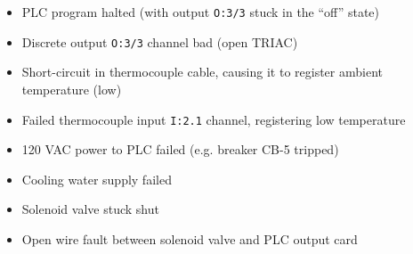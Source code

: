 \begin{itemize}
\item{} PLC program halted (with output {\tt O:3/3} stuck in the ``off'' state)
\item{} Discrete output {\tt O:3/3} channel bad (open TRIAC)
\item{} Short-circuit in thermocouple cable, causing it to register ambient temperature (low)
\item{} Failed thermocouple input {\tt I:2.1} channel, registering low temperature
\item{} 120 VAC power to PLC failed (e.g. breaker CB-5 tripped)
\item{} Cooling water supply failed
\item{} Solenoid valve stuck shut
\item{} Open wire fault between solenoid valve and PLC output card
\end{itemize}











